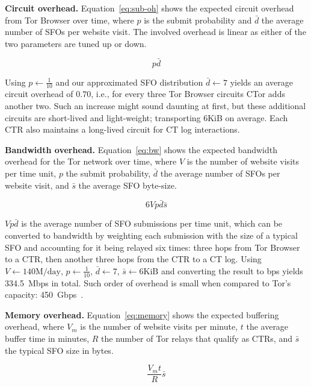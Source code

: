 \textbf{Circuit overhead.}
Equation~\ref{eq:sub-oh} shows the expected circuit overhead from Tor Browser
over time, where $p$ is the submit probability and $\bar{d}$ the average number
of SFOs per website visit.  The involved overhead is linear as either of the two
parameters are tuned up or down.

\begin{equation} \label{eq:sub-oh}
	p\bar{d}
\end{equation}

Using $p\gets\frac{1}{10}$ and our approximated SFO distribution $\bar{d}\gets7$
yields an average circuit overhead of $0.70$, i.e., for every three Tor Browser
circuits CTor adds another two.  Such an increase might sound
daunting at first, but these additional circuits are short-lived and
light-weight; transporting 6KiB on average.  Each CTR also maintains a 
long-lived circuit for CT log interactions.

\textbf{Bandwidth overhead.}  Equation~\ref{eq:bw} shows the expected
bandwidth overhead for the Tor network over time, where
	$V$ is the number of website visits per time unit,
	$p$ the submit probability,
	$\bar{d}$ the average number of SFOs per website visit, and
	$\bar{s}$ the average SFO byte-size.

\begin{equation} \label{eq:bw}
	6Vp\bar{d}\bar{s}
\end{equation}

$Vp\bar{d}$ is the average number of SFO submissions per time unit, which can be
converted to bandwidth by weighting each submission with the size of
a typical SFO and accounting for it being relayed six times:
	three hops from Tor Browser to a CTR, then
	another three hops from the CTR to a CT log.
Using
	$V\gets 140\textrm{M/day}$,
	$p \gets \frac{1}{10}$,
	$\bar{d} \gets 7$,
	$\bar{s} \gets 6\textrm{KiB}$
and converting the result to bps yields 334.5~Mbps in total.  Such order of
overhead is small when compared to Tor's capacity:
450~Gbps~\cite{tor-bandwidth}.

\textbf{Memory overhead.}
Equation~\ref{eq:memory} shows the expected buffering overhead, where
	$V_m$ is the number of website visits per minute,
	$t$ the average buffer time in minutes,
	$R$ the number of Tor relays that qualify as CTRs, and
	$\bar{s}$ the typical SFO size in bytes.

\begin{equation} \label{eq:memory}
	\frac{V_mt}{R} \bar{s}
\end{equation}


